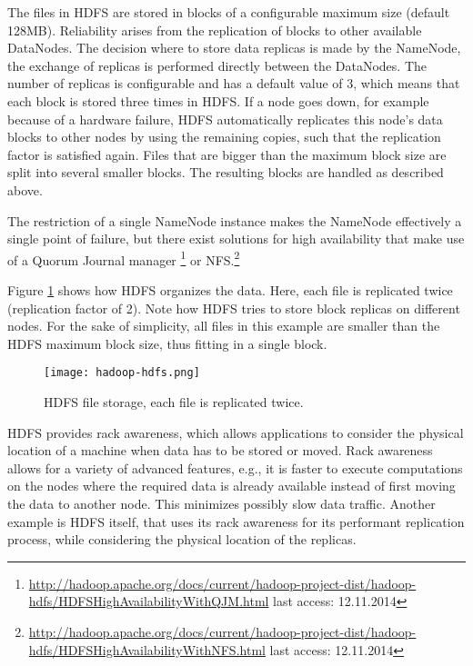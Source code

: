The files in HDFS are stored in blocks of a configurable maximum size (default 128MB). Reliability arises from the replication of blocks to other available DataNodes. The decision where to store data replicas is made by the NameNode, the exchange of replicas is performed directly between the DataNodes. The number of replicas is configurable and has a default value of 3, which means that each block is stored three times in HDFS. If a node goes down, for example because of a hardware failure, HDFS automatically replicates this node's data blocks to other nodes by using the remaining copies, such that the replication factor is satisfied again. Files that are bigger than the maximum block size are split into several smaller blocks. The resulting blocks are handled as described above.

The restriction of a single NameNode instance makes the NameNode effectively a single point of failure, but there exist solutions for high availability that make use of a Quorum Journal manager \footnote{\url{http://hadoop.apache.org/docs/current/hadoop-project-dist/hadoop-hdfs/HDFSHighAvailabilityWithQJM.html} last access: 12.11.2014} or NFS.\footnote{\url{http://hadoop.apache.org/docs/current/hadoop-project-dist/hadoop-hdfs/HDFSHighAvailabilityWithNFS.html} last access: 12.11.2014}

Figure \ref{fig:hadoop-hdfs} shows how HDFS organizes the data. Here, each file is replicated twice (replication factor of 2). Note how HDFS tries to store block replicas on different nodes. For the sake of simplicity, all files in this example are smaller than the HDFS maximum block size, thus fitting in a single block.

\begin{figure}
  \centering
  \texttt{[image: hadoop-hdfs.png]}
  \caption[HDFS file storage]{HDFS file storage, each file is replicated twice.}
  \label{fig:hadoop-hdfs}
\end{figure}

HDFS provides rack awareness, which allows applications to consider the physical location of a machine when data has to be stored or moved. Rack awareness allows for a variety of advanced features, e.g., it is faster to execute computations on the nodes where the required data is already available instead of first moving the data to another node. This minimizes possibly slow data traffic. Another example is HDFS itself, that uses its rack awareness for its performant replication process, while considering the physical location of the replicas.

